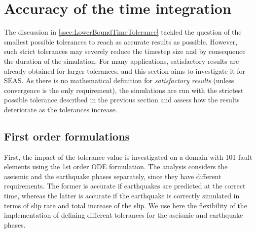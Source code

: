 \section{Accuracy of the time integration}
\label{sec:Results_AccuracyTimeIntegration}
The discussion in \autoref{ssec:LowerBoundTimeTolerance} tackled the question of the smallest possible tolerances to reach as accurate results as possible. However, such strict tolerances may severely reduce the timestep size and by consequence the duration of the simulation. For many applications, satisfactory results are already obtained for larger tolerances, and this section aims to investigate it for SEAS. As there is no mathematical definition for \textit{satisfactory results} (unless convergence is the only requirement), the simulations are run with the strictest possible tolerance described in the previous section and assess how the results deteriorate as the tolerances increase.

\subsection{First order formulations}
First, the impact of the tolerance value is investigated on a domain with 101 fault elements using the 1st order ODE formulation. The analysis considers the aseismic and the earthquake phases separately, since they have different requirements. The former is accurate if earthquakes are predicted at the correct time, whereas the latter is accurate if the earthquake is correctly simulated in terms of slip rate and total increase of the slip. We use here the flexibility of the implementation of defining different tolerances for the aseismic and earthquake phases.


